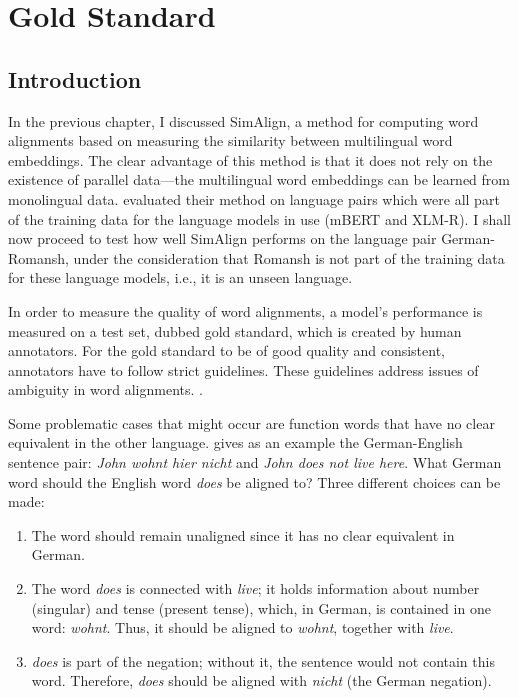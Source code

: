 \chapter{Gold Standard}
\label{chap:gold-standard}
\section{Introduction}
In the previous chapter, I discussed SimAlign, a method for computing word alignments based on measuring the similarity between multilingual word embeddings. 
The clear advantage of this method is that it does not rely on the existence  of parallel data---the multilingual word embeddings can be learned from monolingual data. 
\textcite{jalili-sabet-etal-2020-simalign} evaluated their method on language pairs which were all part of the training data for the language models in use (mBERT and XLM-R). 
I shall now proceed to test how well SimAlign performs on the language pair German-Romansh, under the consideration that Romansh is not part of  the training data for these language models, i.e., it is an unseen language. 

In order to measure the quality of word alignments, a model's performance is measured on a test set, dubbed  gold standard, which is created by human annotators. 
For the gold standard to be of good quality and consistent, annotators have to follow strict guidelines.
These guidelines address issues of ambiguity in word alignments. \autocite[115]{koehn2009}. 

Some problematic cases that might occur are function words\footnotemark{} that have no clear equivalent in the other language.
\textcite{koehn2009} gives as an example the German-English sentence pair: \emph{John wohnt hier nicht}  and \emph{John does not live here}. 
What German word should the English word \emph{does} be aligned to? 
Three different choices can be made:
\begin{enumerate}
	\item The word should remain unaligned since it has no clear equivalent in German.
	\item The word \emph{does} is connected with \emph{live}; it holds information about number (singular) and tense (present tense), which, in German, is contained in one word: \emph{wohnt}. Thus, it should be aligned to \emph{wohnt}, together with \emph{live}.
	\item \emph{does} is part of the negation; without it, the sentence would not contain this word. Therefore, \emph{does} should be aligned with \emph{nicht} (the German negation).
\end{enumerate}

